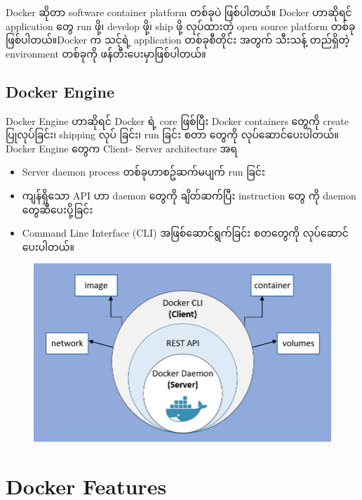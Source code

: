\documentclass{article}
\begin{document}
Docker ဆိုတာ software container platform တစ်ခုပဲ ဖြစ်ပါတယ်။ Docker
ဟာဆိုရင် application ​တွေ run ဖို့၊ develop ဖို့၊ ship ဖို့ လုပ်ထားတဲ့
open source platform တစ်ခုဖြစ်ပါတယ်။Docker က သင့်ရဲ့ application
တစ်ခုစီတိုင်း အတွက် သီးသန့် တည်ရှိတဲ့ environment တစ်ခုကို
ဖန်တီး​ပေးမှာဖြစ်ပါတယ်။

\subsection{Docker Engine}\label{docker-engine}

Docker Engine ဟာဆိုရင် Docker ရဲ့ core ဖြစ်ပြီး Docker containers
​တွေကို create ပြုလုပ်​ခြင်း၊ shipping လုပ် ခြင်း၊ run ခြင်း စတာ ​တွေကို
လုပ်​ဆောင်​ပေးပါတယ်။ Docker Engine ​တွေက Client- Server architecture အရ

\begin{itemize}
\itemsep1pt\parskip0pt
\item
  Server daemon process တစ်ခုဟာစဥ်ဆက်မပျက် run ခြင်း
\item
  ကျန်ရှိ​သော API ဟာ daemon ​တွေကို ချိတ်ဆက်ပြီး instruction ​တွေ ကို
  daemon ​တွေဆီ ​ပေးပို့ခြင်း
\item
  Command Line Interface (CLI) အဖြစ်​ဆောင်ရွက်ခြင်း စတ​တွေကို
  လုပ်​ဆောင်​ပေးပါတယ်။
\end{itemize}

\begin{figure}[htbp]
\centering
\includegraphics[width=0.70\paperwidth]{.gitbook/assets/screenshot-129.png}
\end{figure}

\section{Docker Features}\label{docker-features}
\end{document}
